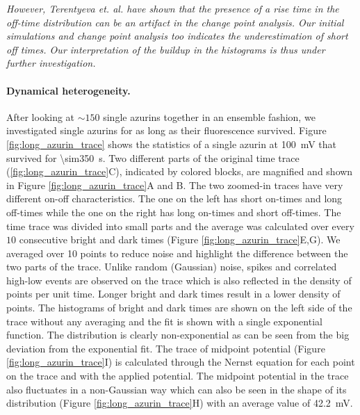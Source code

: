 \documentclass[journal=jacsat,manuscript=article]{achemso}
\begin{document}
\textit{However, Terentyeva et. al. have shown that the presence of a rise time in the off-time distribution can be an artifact in the change point analysis. Our initial simulations and change point analysis too indicates the underestimation of short off times. Our interpretation of the buildup in the histograms is thus under further investigation.}
\paragraph*{Dynamical heterogeneity.}
After looking at ${\sim}150$ single azurins together in an ensemble fashion, we investigated single azurins for as long as their fluorescence survived.
Figure \ref{fig:long_azurin_trace} shows the statistics of a single azurin at \SI{100}{\mV} that survived for \SI{\sim350}{\s}.
Two different parts of the original time trace (\ref{fig:long_azurin_trace}C), indicated by colored blocks, are magnified and shown in Figure \ref{fig:long_azurin_trace}A and B.
The two zoomed-in traces have very different on-off characteristics. The one on the left has short on-times and long off-times while the one on the right has long on-times and short off-times.
The time trace was divided into small parts and the average was calculated over every $10$ consecutive bright and dark times (Figure \ref{fig:long_azurin_trace}E,G).
We averaged over 10 points to reduce noise and highlight the difference between the two parts of the trace.
Unlike random (Gaussian) noise, spikes and correlated high-low events are observed on the trace which is also reflected in the density of points per unit time. Longer bright and dark times result in a lower density of points.
The histograms of bright and dark times are shown on the left side of the trace without any averaging and the fit is shown with a single exponential function.
The distribution is clearly non-exponential as can be seen from the big deviation from the exponential fit.
The trace of midpoint potential (Figure \ref{fig:long_azurin_trace}I) is calculated through the Nernst equation for each point on the trace and with the applied potential.
The midpoint potential in the trace also fluctuates in a non-Gaussian way which can also be seen in the shape of its distribution (Figure \ref{fig:long_azurin_trace}H) with an average value of \SI{42.2}{\mV}.
\end{document}
